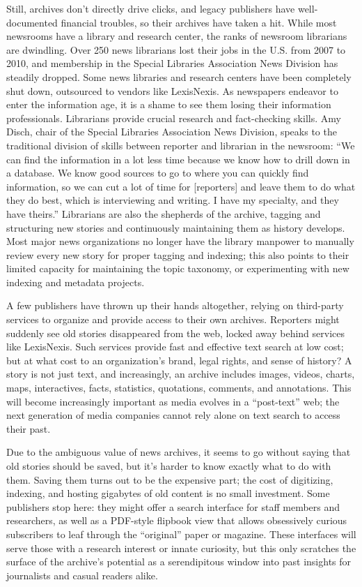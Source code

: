 Still, archives don't directly drive clicks, and legacy publishers have well-documented financial troubles, so their archives have taken a hit. While most newsrooms have a library and research center, the ranks of newsroom librarians are dwindling. Over 250 news librarians lost their jobs in the U.S. from 2007 to 2010, and membership in the Special Libraries Association News Division has steadily dropped. Some news libraries and research centers have been completely shut down, outsourced to vendors like LexisNexis.\autocite{silverman_endangered_2010} As newspapers endeavor to enter the information age, it is a shame to see them losing their information professionals. Librarians provide crucial research and fact-checking skills. Amy Disch, chair of the Special Libraries Association News Division, speaks to the traditional division of skills between reporter and librarian in the newsroom: ``We can find the information in a lot less time because we know how to drill down in a database. We know good sources to go to where you can quickly find information, so we can cut a lot of time for [reporters] and leave them to do what they do best, which is interviewing and writing. I have my specialty, and they have theirs.''\autocite{silverman_endangered_2010} Librarians are also the shepherds of the archive, tagging and structuring new stories and continuously maintaining them as history develops. Most major news organizations no longer have the library manpower to manually review every new story for proper tagging and indexing; this also points to their limited capacity for maintaining the topic taxonomy, or experimenting with new indexing and metadata projects.

A few publishers have thrown up their hands altogether, relying on third-party services to organize and provide access to their own archives.\autocite{romenesko_u.s._2014} Reporters might suddenly see old stories disappeared from the web, locked away behind services like LexisNexis. Such services provide fast and effective text search at low cost; but at what cost to an organization's brand, legal rights, and sense of history? A story is not just text, and increasingly, an archive includes images, videos, charts, maps, interactives, facts, statistics, quotations, comments, and annotations. This will become increasingly important as media evolves in a ``post-text'' web; the next generation of media companies cannot rely alone on text search to access their past.\autocite{salmon_why_2014}

Due to the ambiguous value of news archives, it seems to go without saying that old stories should be saved, but it's harder to know exactly what to do with them. Saving them turns out to be the expensive part; the cost of digitizing, indexing, and hosting gigabytes of old content is no small investment. Some publishers stop here: they might offer a search interface for staff members and researchers, as well as a PDF-style flipbook view that allows obsessively curious subscribers to leaf through the ``original'' paper or magazine. These interfaces will serve those with a research interest or innate curiosity, but this only scratches the surface of the archive's potential as a serendipitous window into past insights for journalists and casual readers alike.

